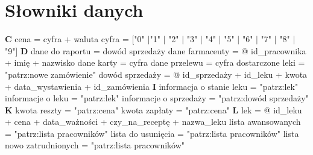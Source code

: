 \documentclass[a4paper, 11pt]{article}
\begin{document}
	\section{Słowniki danych}
	\textbf{C} \newline \newline
	\noindent
	cena = {cyfra} + waluta \newline
	cyfra = ["0" $|$"1" $|$ "2" $|$ "3" $|$ "4" $|$ "5" $|$ "6" $|$ "7" $|$ "8" $|$ "9"] \newline \newline
	\textbf{D} \newline \newline
	\noindent
	dane do raportu = {dowód sprzedaży} \newline
	dane farmaceuty = @ id\_pracownika + imię + nazwisko \newline
	dane karty = {cyfra} \newline
	dane przelewu = {cyfra} \newline
	dostarczone leki = "patrz:nowe zamówienie" \newline
	dowód sprzedaży = @ id\_sprzedaży + id\_leku + kwota + data\_wystawienia + id\_zamówienia \newline \newline
	\textbf{I} \newline \newline
	\noindent
	informacja o stanie leku = "patrz:lek" \newline
	informacje o leku = "patrz:lek" \newline
	informacje o sprzedaży = "patrz:dowód sprzedaży" \newline \newline
	\textbf{K} \newline \newline
	\noindent
	kwota reszty = "patrz:cena" \newline
	kwota zapłaty = "patrz:cena" \newline \newline
	\textbf{L} \newline \newline
	\noindent
	lek = @ id\_leku + cena + data\_ważności + czy\_na\_receptę + nazwa\_leku \newline
	lista awansowanych = "patrz:lista pracowników" \newline
	lista do usunięcia = "patrz:lista pracowników" \newline
	lista nowo zatrudnionych = "patrz:lista pracowników" \newline
\end{document}
